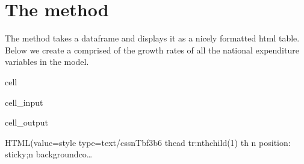 \documentclass[letterpaper,10pt,english]{jupyterBook}
\begin{document}
\section{The  method}
\label{\detokenize{content/07_MoreFeatures/modelwidgets:the-html-widget-df-method}}
\sphinxAtStartPar
The  method takes a dataframe and displays it as a nicely formatted html table.  Below we create a  comprised of the growth rates of all the national expenditure variables in the  model.

\begin{sphinxuseclass}{cell}\begin{sphinxVerbatimInput}

\begin{sphinxuseclass}{cell_input}
\begin{sphinxVerbatim}[commandchars=\\\{\}]
\PYG{p}{[}\PYG{p}{]} 

\PYG{p}{[}\PYG{p}{]}
\end{sphinxVerbatim}

\end{sphinxuseclass}\end{sphinxVerbatimInput}
\begin{sphinxVerbatimOutput}

\begin{sphinxuseclass}{cell_output}
\begin{sphinxVerbatim}[commandchars=\\\{\}]
HTML(value=\PYGZsq{}\PYGZlt{}style type=\PYGZdq{}text/css\PYGZdq{}\PYGZgt{}\PYGZbs{}n\PYGZsh{}T\PYGZus{}bf3b6 thead tr:nth\PYGZhy{}child(1) th \PYGZob{}\PYGZbs{}n  position: sticky;\PYGZbs{}n  background\PYGZhy{}co…
\end{sphinxVerbatim}

\end{sphinxuseclass}\end{sphinxVerbatimOutput}

\end{sphinxuseclass}
\end{document}
